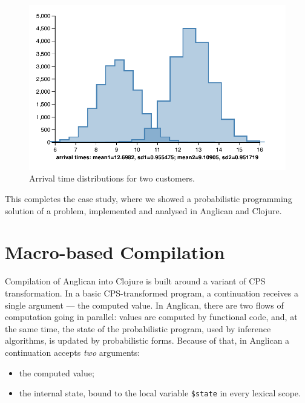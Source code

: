 \documentclass[preprint]{sigplanconf}
\begin{document}
\begin{figure}
    \centering
    \includegraphics[trim={12pt 0 0 0},scale=0.6]{different-customers-times.pdf}
    \caption{Arrival time distributions for two customers.}
    \label{fig:dist-diff}
\end{figure}

\iftoggle{full}{%

}{}%

This completes the case study, where we showed a probabilistic
programming solution of a problem, implemented and analysed in
Anglican and Clojure\iftoggle{full}{, using two different
inference algorithms}{}.

\section{Macro-based Compilation}
\label{sec:compilation}

Compilation of Anglican into Clojure is built around a variant of CPS
transformation. In a basic CPS-transformed program, a
continuation receives a single argument --- the computed value.
In Anglican, there are two flows of computation going in
parallel: values are computed by functional code, and,
at the same time, the state of the probabilistic program,
used by inference algorithms, is updated by
probabilistic forms. Because of that, in Anglican a continuation
accepts  \textit{two} arguments:
\begin{itemize}
    \item the computed value;
    \item the internal state, bound to the local variable
        \texttt{\$state} in every lexical scope.
\end{itemize}
\end{document}
